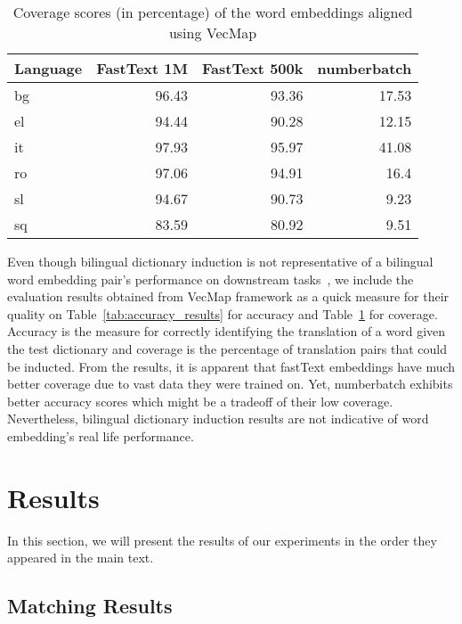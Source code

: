 \begin{table}[htbp]
    \centering
    \begin{tabular}{lrrr}
        \toprule
        \textbf{Language} & \textbf{FastText 1M} & \textbf{FastText 500k} & \textbf{numberbatch} \\
        \midrule
        bg & 96.43 & 93.36 & 17.53 \\
        el & 94.44 & 90.28 & 12.15 \\
        it & 97.93 & 95.97 & 41.08 \\
        ro & 97.06 & 94.91 & 16.4 \\
        sl & 94.67 & 90.73 & 9.23 \\
        sq & 83.59 & 80.92 & 9.51 \\
        \bottomrule
    \end{tabular}
    \caption{Coverage scores (in percentage) of the word embeddings aligned using VecMap}%
    \label{tab:coverage_results}
\end{table}

Even though bilingual dictionary induction is not representative of a bilingual word embedding pair's performance on downstream tasks~\cite{ruder_survey_2017,glavas_how_2019}, we include the evaluation results obtained from VecMap framework as a quick measure for their quality on Table~\ref{tab:accuracy_results} for accuracy and Table~\ref{tab:coverage_results} for coverage.
Accuracy is the measure for correctly identifying the translation of a word given the test dictionary and coverage is the percentage of translation pairs that could be inducted.
From the results, it is apparent that fastText embeddings have much better coverage due to vast data they were trained on.
Yet, numberbatch exhibits better accuracy scores which might be a tradeoff of their low coverage.
Nevertheless, bilingual dictionary induction results are not indicative of word embedding's real life performance.

\section{Results}%
\label{sec:results}

In this section, we will present the results of our experiments in the order they appeared in the main text.

\subsection{Matching Results}%
\label{sub:matching_results}

